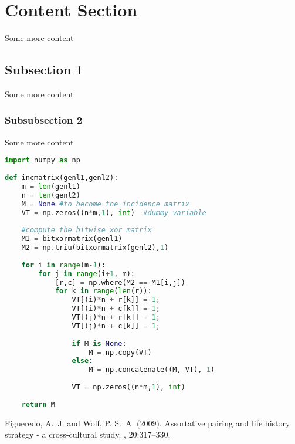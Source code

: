 \documentclass[12pt]{article} %
\begin{document}
\section{Content Section} %

Some more content

\subsection{Subsection 1} %

Some more content

\subsubsection{Subsubsection 2} %

Some more content

\begin{lstlisting}[language=Python]
import numpy as np
 
def incmatrix(genl1,genl2):
    m = len(genl1)
    n = len(genl2)
    M = None #to become the incidence matrix
    VT = np.zeros((n*m,1), int)  #dummy variable
 
    #compute the bitwise xor matrix
    M1 = bitxormatrix(genl1)
    M2 = np.triu(bitxormatrix(genl2),1) 
 
    for i in range(m-1):
        for j in range(i+1, m):
            [r,c] = np.where(M2 == M1[i,j])
            for k in range(len(r)):
                VT[(i)*n + r[k]] = 1;
                VT[(i)*n + c[k]] = 1;
                VT[(j)*n + r[k]] = 1;
                VT[(j)*n + c[k]] = 1;
 
                if M is None:
                    M = np.copy(VT)
                else:
                    M = np.concatenate((M, VT), 1)
 
                VT = np.zeros((n*m,1), int)
 
    return M
\end{lstlisting}


\begin{thebibliography}{99} %

Figueredo, A.~J. and Wolf, P. S.~A. (2009).
\newblock Assortative pairing and life history strategy - a cross-cultural
  study.
, 20:317--330.
 
\end{thebibliography}

\end{document}
